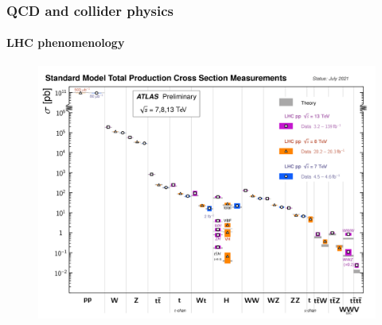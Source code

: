 \documentclass[aspectratio=43]{beamer}
\begin{document}
\begin{frame}
	
	\frametitle{QCD and collider physics}
	\framesubtitle{LHC phenomenology}
	
	\begin{figure}
		\includegraphics[width = 8.5 cm]{plots/part1/chapter3/lhc_measurements.png}
	\end{figure}

\end{frame}

%
%

\begin{frame}


\end{frame}
\end{document}
